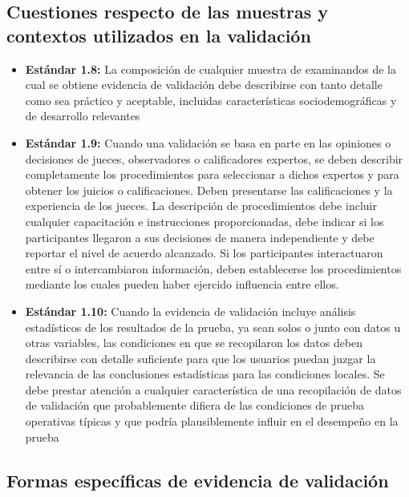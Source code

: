\documentclass[
  letterpaper,
  DIV=11,
  numbers=noendperiod]{scrreprt}
\providecommand{\tightlist}{%
  \setlength{\itemsep}{0pt}\setlength{\parskip}{0pt}}
\begin{document}
\subsection{Cuestiones respecto de las muestras y contextos utilizados
en la
validación}\label{cuestiones-respecto-de-las-muestras-y-contextos-utilizados-en-la-validaciuxf3n}

\begin{itemize}
\tightlist
\item
  \textbf{Estándar 1.8:} La composición de cualquier muestra de
  examinandos de la cual se obtiene evidencia de validación debe
  describirse con tanto detalle como sea práctico y aceptable, incluidas
  características sociodemográficas y de desarrollo relevantes
\item
  \textbf{Estándar 1.9:} Cuando una validación se basa en parte en las
  opiniones o decisiones de jueces, observadores o calificadores
  expertos, se deben describir completamente los procedimientos para
  seleccionar a dichos expertos y para obtener los juicios o
  calificaciones. Deben presentarse las calificaciones y la experiencia
  de los jueces. La descripción de procedimientos debe incluir cualquier
  capacitación e instrucciones proporcionadas, debe indicar si los
  participantes llegaron a sus decisiones de manera independiente y debe
  reportar el nivel de acuerdo alcanzado. Si los participantes
  interactuaron entre sí o intercambiaron información, deben
  establecerse los procedimientos mediante los cuales pueden haber
  ejercido influencia entre ellos.
\item
  \textbf{Estándar 1.10:} Cuando la evidencia de validación incluye
  análisis estadísticos de los resultados de la prueba, ya sean solos o
  junto con datos u otras variables, las condiciones en que se
  recopilaron los datos deben describirse con detalle suficiente para
  que los usuarios puedan juzgar la relevancia de las conclusiones
  estadísticas para las condiciones locales. Se debe prestar atención a
  cualquier característica de una recopilación de datos de validación
  que probablemente difiera de las condiciones de prueba operativas
  típicas y que podría plausiblemente influir en el desempeño en la
  prueba
\end{itemize}

\subsection{Formas específicas de evidencia de
validación}\label{formas-especuxedficas-de-evidencia-de-validaciuxf3n}
\end{document}
